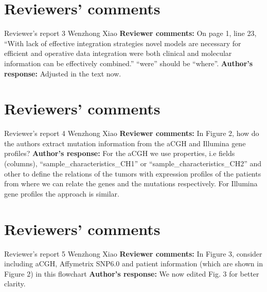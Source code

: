 \documentclass{bmcart}
\begin{document}
\begin{backmatter}
\section*{Reviewers' comments}
\newline Reviewer's report 3
\newline Wenzhong Xiao
\newline \textbf{Reviewer comments:}
On page 1, line 23, “With lack of effective integration strategies novel models are necessary for efficient and operative data integration were both clinical and molecular information can be effectively combined.” “were” should be “where”.
\newline \textbf{Author's response:}
Adjusted in the text now.

\section*{Reviewers' comments}
\newline Reviewer's report 4
\newline Wenzhong Xiao
\newline \textbf{Reviewer comments:}
 In Figure 2, how do the authors extract mutation information from the aCGH and Illumina gene profiles? 
\newline \textbf{Author's response:}
For the aCGH we use properties, i.e fields (columns), “sample_characteristics_CH1” or “sample_characteristics_CH2” and other to define the relations of the tumors with expression profiles of the patients from where we can relate the genes and the mutations respectively. For Illumina gene profiles the approach is similar.

\section*{Reviewers' comments}
\newline Reviewer's report 5
\newline Wenzhong Xiao
\newline \textbf{Reviewer comments:}
In Figure 3, consider including aCGH, Affymetrix SNP6.0 and patient information (which are shown in Figure 2) in this flowchart
\newline \textbf{Author's response:}
We now edited Fig. 3 for better clarity.



\end{backmatter}
\end{document}
